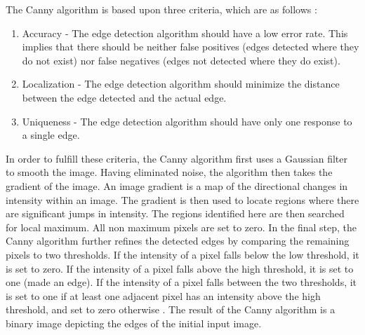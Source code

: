 \documentclass{sig-alternate}
\begin{document}
The Canny algorithm is based upon three criteria, which are as follows \cite{Canny:1986, CannySummarized}:
\begin{enumerate}
\item Accuracy - The edge detection algorithm should have a low error rate. This implies that there should be neither false positives (edges detected where they do not exist) nor false negatives (edges not detected where they do exist).
\item Localization - The edge detection algorithm should minimize the distance between the edge detected and the actual edge.
\item Uniqueness - The edge detection algorithm should have only one response to a single edge.
\end{enumerate}

In order to fulfill these criteria, the Canny algorithm first uses a Gaussian filter to smooth the image. Having eliminated noise, the algorithm then takes the gradient of the image. An image gradient is a map of the directional changes in intensity within an image. The gradient is then used to locate regions where there are significant jumps in intensity. The regions identified here are then searched for local maximum. All non maximum pixels are set to zero. In the final step, the Canny algorithm further refines the detected edges by comparing the remaining pixels to two thresholds. If the intensity of a pixel falls below the low threshold, it is set to zero. If the intensity of a pixel falls above the high threshold, it is set to one (made an edge). If the intensity of a pixel falls between the two thresholds, it is set to one if at least one adjacent pixel has an intensity above the high threshold, and set to zero otherwise \cite{CannySummarized}. The result of the Canny algorithm is a binary image depicting the edges of the initial input image.
\end{document}
